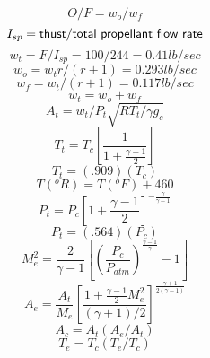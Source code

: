 

\begin{equation}
O/F = w_{o}/w_{f} 
\end{equation}
\begin{equation}
I_{sp} = {\sf thust}/{\sf total\ propellant\ flow\ rate} 
\end{equation}
\begin{equation}
w_{t} = F/I_{sp} = 100/244 = 0.41 {lb/sec} 
\end{equation}
\begin{equation}
w_{o} = w_{t} r/(r+1) = 0.293 {lb/sec} 
\end{equation}
\begin{equation}
w_{f} = w_{t}/(r+1) = 0.117 {lb/sec} 
\end{equation}
\begin{equation}
w_{t} = w_{o} + w_{f} 
\end{equation}
\begin{equation}
A_{t} = w_{t}/P_{t} \sqrt{R T_{t}/\gamma g_{c}}
\end{equation}
\begin{equation}
T_{t} = T_{c}\left [{\frac{1}{1 + \frac{\gamma - 1}{2}}}\right ]
\end{equation}
\begin{equation}
T_{t} = (.909)(T_{c}) 
\end{equation}
\begin{equation}
T(^{o} R) = T (^{o} F) + 460 
\end{equation}
\begin{equation}
P_{t} = P_{c}\left [{1 + \frac{\gamma - 1}{2}} \right ]
^{-\frac{\gamma}{\gamma - 1}}
\end{equation}
\begin{equation}
P_{t} = (.564)(P_{c}) 
\end{equation}
\begin{equation}
M_{e}^{2} = \frac{2}{\gamma - 1}
\left [{\left (\frac{P_{c}}{P_{atm}}\right )
^{\frac{\gamma-1}{\gamma}} -1}\right ] 
\end{equation}
\begin{equation}
A_{e} = \frac{A_{t}}{M_{e}} \left [
\frac{1 + \frac{\gamma-1}{2} M_{e}^{2}}
{(\gamma+1)/2}
\right ]^{\frac{\gamma+1}{2(\gamma-1)}}
\end{equation}
\begin{equation}
A_{c} = A_{t} (A_{e}/A_{t})
\end{equation}
\begin{equation}
T_{e} = T_{c} (T_{e}/T_{c})
\end{equation}

